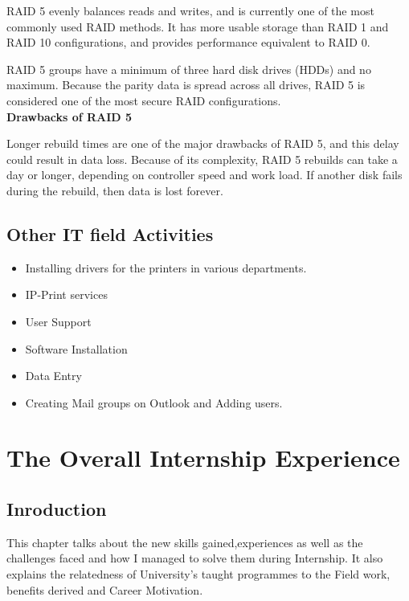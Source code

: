 \documentclass{article}
\begin{document}
\par RAID 5 evenly balances reads and writes, and is currently one of the most commonly used RAID methods. It has more usable storage than RAID 1 and RAID 10 configurations, and provides performance equivalent to RAID 0.
\par RAID 5 groups have a minimum of three hard disk drives (HDDs) and no maximum. Because the parity data is spread across all drives, RAID 5 is considered one of the most secure RAID configurations.\\
\textbf{Drawbacks of RAID 5} \cite{chen1996performance}
\par Longer rebuild times are one of the major drawbacks of RAID 5, and this delay could result in data loss. Because of its complexity, RAID 5 rebuilds can take a day or longer, depending on controller speed and work load. If another disk fails during the rebuild, then data is lost forever.










\subsection{Other IT field Activities}
\begin{itemize}
\item Installing drivers for the printers in various departments.
\item IP-Print services
\item User Support
\item Software Installation
\item Data Entry
\item Creating Mail groups on Outlook and Adding users.
\end{itemize}
\newpage
\section{The Overall Internship Experience}
\subsection{Inroduction}
This chapter talks about the  new skills gained,experiences as well as the challenges faced and how I managed to solve them during Internship. It also explains the relatedness of University’s taught programmes to the Field work, benefits derived and Career Motivation.
\end{document}
